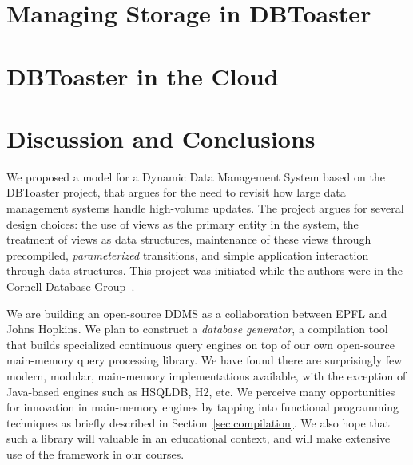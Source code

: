 \documentclass{sig-alternate}
\newcommand{\tinysection}[1]{\vspace{0.5mm}\noindent{\bf #1.}}
\begin{document}
\section{Managing Storage in DBToaster}
\label{sec:storage}



\section{DBToaster in the Cloud}
\label{sec:distribution}


\section{Discussion and Conclusions}
We proposed a model for a Dynamic Data Management System based on the DBToaster
project, that argues for the need to revisit how large data management systems
handle high-volume updates. The project argues for several design choices: the
use of views as the primary entity in the system, the treatment of
views as data structures, maintenance of these views through precompiled,
\textit{parameterized} transitions, and simple application interaction
through data structures. This project was initiated while the authors were in
the Cornell Database Group~\cite{ahmad-vldb:09}.

\tinysection{Implementation plan}
We are building an open-source DDMS as a collaboration between EPFL and Johns
Hopkins. We plan to construct a \textit{database generator}, a compilation tool
that builds specialized continuous query engines on top of our own open-source
main-memory query processing library. We have found there are surprisingly few
modern, modular, main-memory implementations available, with the exception of
Java-based engines such as HSQLDB, H2, etc. We perceive many opportunities for
innovation in main-memory engines by tapping into functional programming
techniques as briefly described in Section~\ref{sec:compilation}. We also hope
that such a library will valuable in an educational context, and will make extensive use
of the framework in our courses.


\scriptsize{


}
\end{document}

